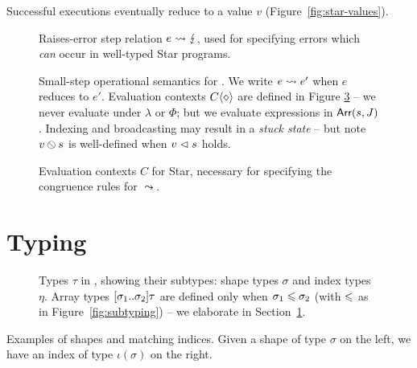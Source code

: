Successful executions eventually reduce to a value $v$ (Figure~\ref{fig:star-values}). 

\begin{figure}
    \centering
    
    \caption{Raises-error step relation $e \leadsto \lightning$, used for specifying errors which \emph{can} occur in well-typed Star programs.}
    \label{fig:opsem-err}
\end{figure}

\begin{figure}
    \centering
    
    \caption{
        Small-step operational semantics for \starr{}. We write $e \leadsto e'$ when $e$ reduces to $e'$.
        Evaluation contexts $\evalctx$ are defined in Figure \ref{fig:evalctx} -- we never evaluate under $\lambda$ or $\Phi$; but we evaluate expressions in $\textsf{Arr}(s,J)$.
        Indexing and broadcasting may result in a \emph{stuck state} -- but note ${v} \obslash {s}$ is well-defined when $v \vartriangleleft s$ holds.
    }
    \label{fig:opsem}
\end{figure}

\begin{figure}
    \centering
    
    \caption{Evaluation contexts $C$ for Star, necessary for specifying the congruence rules for $\leadsto$.}
    \label{fig:evalctx}
\end{figure}

\section{Typing}
\label{sec:typing}

\begin{figure}[t]
    \centering
    
    \caption{Types $\tau$ in \starr{}, showing their subtypes: shape types $\sigma$
    and index types $\eta$.
    Array types $\sarraytype{\sigma_1}{\sigma_2}{\tau}$ are defined only when $\sigma_1 \leqslant \sigma_2$ (with $\leqslant$ as in Figure~\ref{fig:subtyping}) -- we elaborate in Section~\ref{sec:typing}.
    }
    \label{fig:types}
\end{figure}

\begin{table}[t]
    \centering
    
    \caption{Examples of shapes and matching indices. Given a shape of type $\sigma$ on the left, we have an index of type $\iota(\sigma)$ on the right.}
    \label{tab:shape-index-examples}
\end{table}

